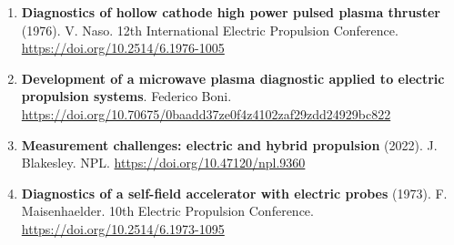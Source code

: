 \documentclass[11pt,a4paper]{article}
\begin{document}
\begin{enumerate}[leftmargin=1.4em]
\item \textbf{Diagnostics of hollow cathode high power pulsed plasma thruster} (1976). V. Naso. 12th International Electric Propulsion Conference. \url{https://doi.org/10.2514/6.1976-1005}
\item \textbf{Development of a microwave plasma diagnostic applied to electric propulsion systems}. Federico Boni. \url{https://doi.org/10.70675/0baadd37ze0f4z4102zaf29zdd24929bc822}
\item \textbf{Measurement challenges: electric and hybrid propulsion} (2022). J. Blakesley. NPL. \url{https://doi.org/10.47120/npl.9360}
\item \textbf{Diagnostics of a self-field accelerator with electric probes} (1973). F. Maisenhaelder. 10th Electric Propulsion Conference. \url{https://doi.org/10.2514/6.1973-1095}
\end{enumerate}
\end{document}
